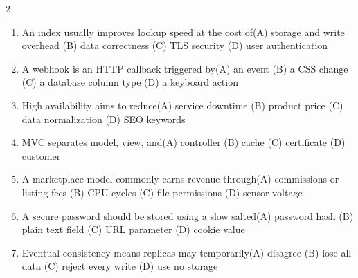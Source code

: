 \documentclass[a4paper]{article}
\begin{document}
\begin{multicols*}{2}
\begin{enumerate}
\item An index usually improves lookup speed at the cost of\newline\hspace*{0.6em}(A) storage and write overhead \quad (B) data correctness \newline\hspace*{0.6em}(C) TLS security \quad (D) user authentication
\item A webhook is an HTTP callback triggered by\newline\hspace*{0.6em}(A) an event \quad (B) a CSS change \newline\hspace*{0.6em}(C) a database column type \quad (D) a keyboard action
\item High availability aims to reduce\newline\hspace*{0.6em}(A) service downtime \quad (B) product price \newline\hspace*{0.6em}(C) data normalization \quad (D) SEO keywords
\item MVC separates model, view, and\newline\hspace*{0.6em}(A) controller \quad (B) cache \newline\hspace*{0.6em}(C) certificate \quad (D) customer
\item A marketplace model commonly earns revenue through\newline\hspace*{0.6em}(A) commissions or listing fees \quad (B) CPU cycles \newline\hspace*{0.6em}(C) file permissions \quad (D) sensor voltage
\item A secure password should be stored using a slow salted\newline\hspace*{0.6em}(A) password hash \quad (B) plain text field \newline\hspace*{0.6em}(C) URL parameter \quad (D) cookie value
\item Eventual consistency means replicas may temporarily\newline\hspace*{0.6em}(A) disagree \quad (B) lose all data \newline\hspace*{0.6em}(C) reject every write \quad (D) use no storage

\end{enumerate}
\end{multicols*}
\end{document}
